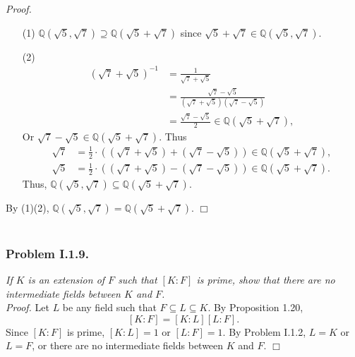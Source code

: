 \documentclass{article}
\begin{document}
\emph{Proof.}
\begin{enumerate}
\item[(1)]
$\mathbb{Q}(\sqrt{5}, \sqrt{7}) \supseteq \mathbb{Q}(\sqrt{5} + \sqrt{7})$
since $\sqrt{5} + \sqrt{7} \in \mathbb{Q}(\sqrt{5}, \sqrt{7})$.
\item[(2)]
\begin{align*}
(\sqrt{7} + \sqrt{5})^{-1}
&= \frac{1}{\sqrt{7} + \sqrt{5}} \\
&= \frac{\sqrt{7} - \sqrt{5}}{(\sqrt{7} + \sqrt{5})(\sqrt{7} - \sqrt{5})} \\
&= \frac{\sqrt{7} - \sqrt{5}}{2} \in \mathbb{Q}(\sqrt{5} + \sqrt{7}),
\end{align*}
Or $\sqrt{7} - \sqrt{5} \in \mathbb{Q}(\sqrt{5} + \sqrt{7})$. Thus
\begin{align*}
\sqrt{7}
&= \frac{1}{2} \cdot ((\sqrt{7} + \sqrt{5}) + (\sqrt{7} - \sqrt{5}))
\in \mathbb{Q}(\sqrt{5} + \sqrt{7}), \\
\sqrt{5}
&= \frac{1}{2} \cdot ((\sqrt{7} + \sqrt{5}) - (\sqrt{7} - \sqrt{5}))
\in \mathbb{Q}(\sqrt{5} + \sqrt{7}).
\end{align*}
Thus, $\mathbb{Q}(\sqrt{5}, \sqrt{7}) \subseteq \mathbb{Q}(\sqrt{5} + \sqrt{7})$.
\end{enumerate}
By (1)(2), $\mathbb{Q}(\sqrt{5}, \sqrt{7}) = \mathbb{Q}(\sqrt{5} + \sqrt{7})$.
$\Box$ \\\\






\subsubsection*{Problem I.1.9.}
\emph{If $K$ is an extension of $F$ such that $[K:F]$ is prime,
show that there are no intermediate fields between $K$ and $F$.} \\

\emph{Proof.}
Let $L$ be any field such that $F \subseteq L \subseteq K$.
By Proposition 1.20,
$$[K:F] = [K:L][L:F].$$
Since $[K:F]$ is prime, $[K:L] = 1$ or $[L:F] = 1$.
By Problem I.1.2, $L=K$ or $L=F$,
or there are no intermediate fields between $K$ and $F$.
$\Box$ \\\\
\end{document}
